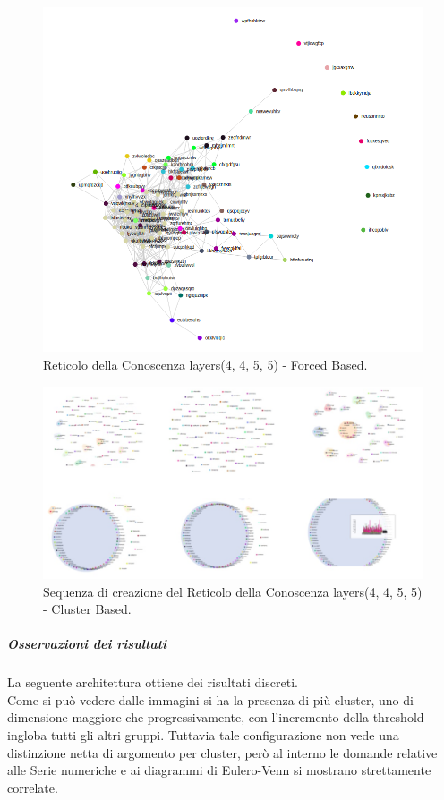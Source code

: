 \begin{figure}[H]
\centering
	\includegraphics[width=0.70\linewidth]{./image/logica(4,4,5,5)_forced.png}
	\caption{Reticolo della Conoscenza layers(4, 4, 5, 5) - Forced Based.}
	\label{Reticolo della Conoscenza layers(4, 4, 5, 5) - Forced Based.}
\end{figure}
\noindent
\begin{figure}[H]
\centering
	\includegraphics[width=0.70\linewidth]{./image/collage_reticolo-logica(4,4,5,5).png}
	\caption{Sequenza di creazione del Reticolo della Conoscenza layers(4, 4, 5, 5) - Cluster Based.}
	\label{Sequenza di creazione del Reticolo della Conoscenza layers(4, 4, 5, 5) - Cluster Based.}
\end{figure}
\noindent
\subparagraph{Osservazioni dei risultati}\mbox{}
\label{Osservazioni dei risultati}
La seguente architettura ottiene dei risultati discreti.\\
Come si può vedere dalle immagini si ha la presenza di più cluster, uno di dimensione maggiore che progressivamente, con l'incremento della threshold ingloba tutti gli altri gruppi. Tuttavia tale configurazione non vede una distinzione netta di argomento per cluster, però al interno le domande relative alle Serie numeriche e ai diagrammi di Eulero-Venn si mostrano strettamente correlate.
